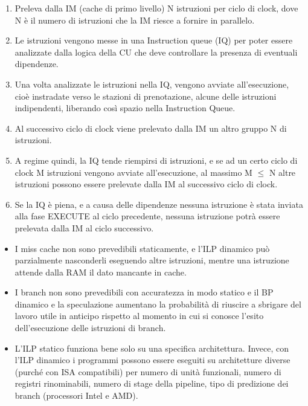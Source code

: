 \begin{enumerate}
  \item Preleva dalla IM (cache di primo livello) N istruzioni per ciclo di clock, dove N è il numero di istruzioni che la IM riesce a fornire in parallelo. 
  \item Le istruzioni vengono messe in una Instruction queue (IQ) per poter essere analizzate dalla logica della CU che deve controllare la presenza di eventuali dipendenze. 
  \item Una volta analizzate le istruzioni nella IQ, vengono avviate
all’esecuzione, cioè instradate verso le stazioni di prenotazione, alcune delle istruzioni indipendenti, liberando così spazio nella
Instruction Queue. 
\item Al successivo ciclo di clock viene prelevato dalla IM un altro
gruppo N di istruzioni. 
\item A regime quindi, la IQ tende riempirsi di istruzioni, e se ad un certo
ciclo di clock M istruzioni vengono avviate all’esecuzione, al
massimo M $\leq$ N altre istruzioni possono essere prelevate dalla IM al
successivo ciclo di clock.
\item Se la IQ è piena, e a causa delle dipendenze
nessuna istruzione è stata inviata alla fase EXECUTE al ciclo
precedente, nessuna istruzione potrà essere prelevata dalla IM
al ciclo successivo. 

\end{enumerate}



\begin{itemize}
  \item I miss cache non sono prevedibili staticamente, e l’ILP dinamico
può parzialmente nasconderli eseguendo altre istruzioni, mentre una
istruzione attende dalla RAM il dato mancante in cache.  
\item I branch non sono prevedibili con accuratezza in modo statico
e il BP dinamico e la speculazione aumentano la probabilità di
riuscire a sbrigare del lavoro utile in anticipo rispetto al momento
in cui si conosce l’esito dell’esecuzione delle istruzioni di branch. 
\item L’ILP statico funziona bene solo su una specifica architettura. Invece,
con l’ILP dinamico i programmi possono essere eseguiti su
architetture diverse (purché con ISA compatibili) per numero di
unità funzionali, numero di registri rinominabili, numero di stage
della pipeline, tipo di predizione dei branch (processori Intel e
AMD).
\end{itemize}

